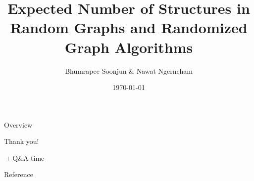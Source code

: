 \documentclass[aspectratio=169]{beamer}
\title{Expected Number of Structures in Random Graphs and Randomized Graph Algorithms}
\author{Bhumrapee Soonjun \& Nawat Ngerncham}
\date{\today}
\begin{document}
\begin{frame}
  \titlepage
\end{frame}

\begin{frame}{Overview}
  \tableofcontents
\end{frame}







\begin{frame}
    \begin{center}
        \Huge{Thank you!}

        \Large{\({}+{}\)Q\&A time}
    \end{center}    
\end{frame}

\begin{frame}{Reference}
    
    
\end{frame}
\end{document}
